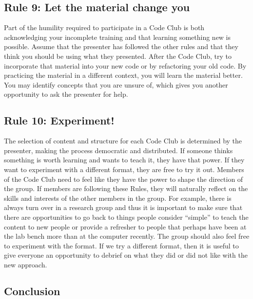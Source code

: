 \documentclass[
  11pt,
]{article}
\begin{document}
\hypertarget{rule-9-let-the-material-change-you}{%
\subsection{Rule 9: Let the material change
you}\label{rule-9-let-the-material-change-you}}

Part of the humility required to participate in a Code Club is both
acknowledging your incomplete training and that learning something new
is possible. Assume that the presenter has followed the other rules and
that they think you should be using what they presented. After the Code
Club, try to incorporate that material into your new code or by
refactoring your old code. By practicing the material in a different
context, you will learn the material better. You may identify concepts
that you are unsure of, which gives you another opportunity to ask the
presenter for help.

\hypertarget{rule-10-experiment}{%
\subsection{Rule 10: Experiment!}\label{rule-10-experiment}}

The selection of content and structure for each Code Club is determined
by the presenter, making the process democratic and distributed. If
someone thinks something is worth learning and wants to teach it, they
have that power. If they want to experiment with a different format,
they are free to try it out. Members of the Code Club need to feel like
they have the power to shape the direction of the group. If members are
following these Rules, they will naturally reflect on the skills and
interests of the other members in the group. For example, there is
always turn over in a research group and thus it is important to make
sure that there are opportunities to go back to things people consider
``simple'' to teach the content to new people or provide a refresher to
people that perhaps have been at the lab bench more than at the computer
recently. The group should also feel free to experiment with the format.
If we try a different format, then it is useful to give everyone an
opportunity to debrief on what they did or did not like with the new
approach.

\hypertarget{conclusion}{%
\subsection{Conclusion}\label{conclusion}}
\end{document}
